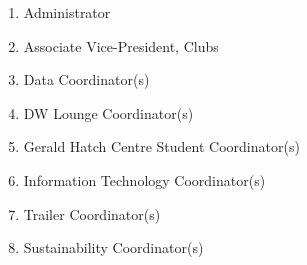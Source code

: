 \begin{enumerate}
  \begin{enumerate}
   \item
    Administrator
   \item
    Associate Vice-President, Clubs
   \item
    Data Coordinator(s)
   \item
    DW Lounge Coordinator(s)
   \item
    Gerald Hatch Centre Student Coordinator(s)
   \item
    Information Technology Coordinator(s)
   \item
    Trailer Coordinator(s)
   \item
    Sustainability Coordinator(s)

  \end{enumerate}
\end{enumerate}